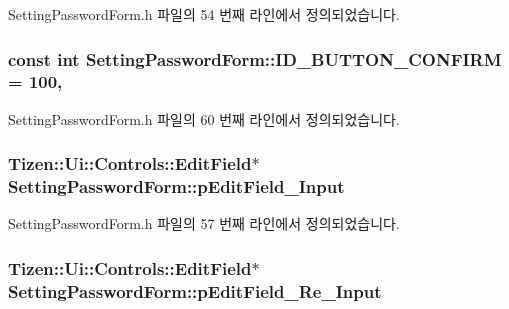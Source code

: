 Setting\+Password\+Form.\+h 파일의 54 번째 라인에서 정의되었습니다.

\hypertarget{class_setting_password_form_ac831ee19d4e476224c2ee4bd87df8a0b}{
\subsubsection[{I\+D\+\_\+\+B\+U\+T\+T\+O\+N\+\_\+\+C\+O\+N\+F\+I\+R\+M}]{\setlength{\rightskip}{0pt plus 5cm}const int Setting\+Password\+Form\+::\+I\+D\+\_\+\+B\+U\+T\+T\+O\+N\+\_\+\+C\+O\+N\+F\+I\+R\+M = 100\hspace{0.3cm}{\ttfamily [static]}, {\ttfamily [protected]}}}\label{class_setting_password_form_ac831ee19d4e476224c2ee4bd87df8a0b}


Setting\+Password\+Form.\+h 파일의 60 번째 라인에서 정의되었습니다.

\hypertarget{class_setting_password_form_a2cd9d5f0b6101f19f47dbf6c6d268d71}{
\subsubsection[{p\+Edit\+Field\+\_\+\+Input}]{\setlength{\rightskip}{0pt plus 5cm}Tizen\+::\+Ui\+::\+Controls\+::\+Edit\+Field$\ast$ Setting\+Password\+Form\+::p\+Edit\+Field\+\_\+\+Input\hspace{0.3cm}{\ttfamily [protected]}}}\label{class_setting_password_form_a2cd9d5f0b6101f19f47dbf6c6d268d71}


Setting\+Password\+Form.\+h 파일의 57 번째 라인에서 정의되었습니다.

\hypertarget{class_setting_password_form_a45848a36b44d294a9e7ddd1d921c990d}{
\subsubsection[{p\+Edit\+Field\+\_\+\+Re\+\_\+\+Input}]{\setlength{\rightskip}{0pt plus 5cm}Tizen\+::\+Ui\+::\+Controls\+::\+Edit\+Field$\ast$ Setting\+Password\+Form\+::p\+Edit\+Field\+\_\+\+Re\+\_\+\+Input\hspace{0.3cm}{\ttfamily [protected]}}}\label{class_setting_password_form_a45848a36b44d294a9e7ddd1d921c990d}


